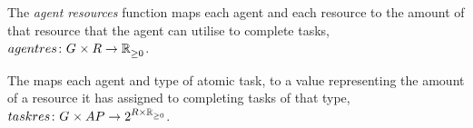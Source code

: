 




\newcommand{\formalAgentResources}[2]{
	\functionFormal{agentres}
	{\setAgents{}{} \times \setResource{}{}}
	{\setRealNumbersNonNegative{}{}}
}
\newcommand{\functionAgentResources}[2]{
	\functionSignature{agentres}{\varAgent{}{}, \varResource{}{}}
}
The \textit{agent resources} function maps each agent and each resource to the amount of that resource that the agent can utilise to complete tasks, $\formalAgentResources{}{}$.

\newcommand{\formalTaskResourceAllocation}[2]{
	\functionFormal{taskres}
	{\setAgents{}{} \times \setAtomicTaskType{}{}}
	{\powerSetSymbol{\setResource{}{} \times \setRealNumbersNonNegative{}  {}}{}{}}
}
\newcommand{\functionTaskResourceAllocation}[2]{
	\functionSignature{taskres}
	{\varAgent{}{}, \varAtomicTask{}{}}
}
The  maps each agent and type of atomic task, to a value representing the amount of a resource it has assigned to completing tasks of that type, $\formalTaskResourceAllocation{}{}$.

